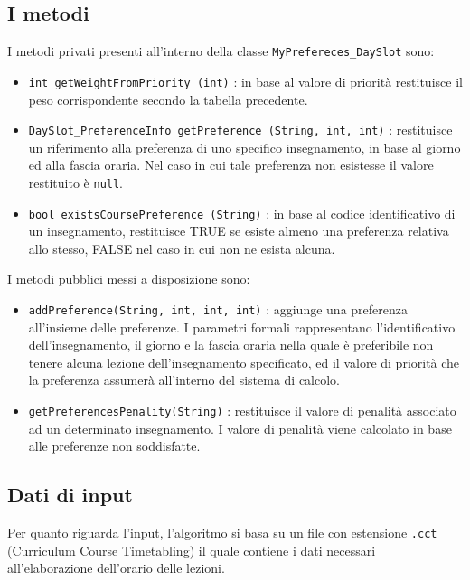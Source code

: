 \documentclass[11pt,a4paper]{article}
\begin{document}
\subsection*{I metodi}
I metodi privati presenti all'interno della classe \verb|MyPrefereces_DaySlot| sono:
\begin{itemize}
\item \verb|int getWeightFromPriority (int)| : in base al valore di priorità restituisce il peso corrispondente secondo la tabella precedente.
\item \verb|DaySlot_PreferenceInfo getPreference (String, int, int)| : restituisce un riferimento alla preferenza di uno specifico insegnamento, in base al giorno ed alla fascia oraria. Nel caso in cui tale preferenza non esistesse il valore restituito è \verb|null|.
\item \verb|bool existsCoursePreference (String)| : in base al codice identificativo di un insegnamento, restituisce TRUE se esiste almeno una preferenza relativa allo stesso, FALSE nel caso in cui non ne esista alcuna.
\end{itemize}

I metodi pubblici messi a disposizione sono:
\begin{itemize}
\item \verb|addPreference(String, int, int, int)| : aggiunge una preferenza all'insieme delle preferenze. I parametri formali rappresentano l'identificativo dell'insegnamento, il giorno e la fascia oraria nella quale è preferibile non tenere alcuna lezione dell'insegnamento specificato, ed il valore di priorità che la preferenza assumerà all'interno del sistema di calcolo.
\item \verb|getPreferencesPenality(String)| : restituisce il valore di penalità associato ad un determinato insegnamento. I valore di penalità viene calcolato in base alle preferenze non soddisfatte.
\end{itemize}
\subsection*{Dati di input}\label{Algo_Input}
Per quanto riguarda l'input, l'algoritmo si basa su un file con estensione \verb|.cct| (Curriculum Course Timetabling) il quale contiene i dati necessari all'elaborazione dell'orario delle lezioni.
\end{document}
